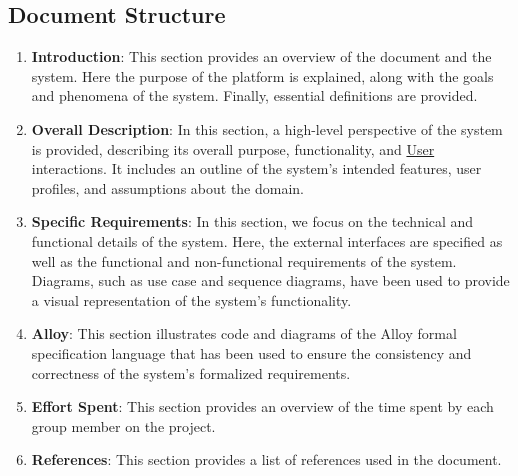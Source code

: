 \subsection{Document Structure}
\begin{enumerate}
    \item \textcolor{titleColor}{\textbf{Introduction}}: This section provides an overview of the document and the system. Here the purpose of the platform is explained, along with the goals and phenomena of the system. Finally, essential definitions are provided.
    \item \textcolor{titleColor}{\textbf{Overall Description}}: In this section, a high-level perspective of the system is provided, describing its overall purpose, functionality, and \hyperref[def:user]{User} interactions. It includes an outline of the system's intended features, user profiles, and assumptions about the domain.
    \item \textcolor{titleColor}{\textbf{Specific Requirements}}: In this section, we focus on the technical and functional details of the system. Here, the external interfaces are specified as well as the functional and non-functional requirements of the system. Diagrams, such as use case and sequence diagrams, have been used to provide a visual representation of the system's functionality.
    \item \textcolor{titleColor}{\textbf{Alloy}}: This section illustrates code and diagrams of the Alloy formal specification language that has been used to ensure the consistency and correctness of the system's formalized requirements.
    \item \textcolor{titleColor}{\textbf{Effort Spent}}: This section provides an overview of the time spent by each group member on the project.
    \item \textcolor{titleColor}{\textbf{References}}: This section provides a list of references used in the document.
\end{enumerate}
